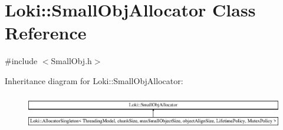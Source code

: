 \hypertarget{classLoki_1_1SmallObjAllocator}{}\section{Loki\+:\+:Small\+Obj\+Allocator Class Reference}
\label{classLoki_1_1SmallObjAllocator}


{\ttfamily \#include $<$Small\+Obj.\+h$>$}

Inheritance diagram for Loki\+:\+:Small\+Obj\+Allocator\+:\begin{figure}[H]
\begin{center}
\leavevmode
\includegraphics[height=1.559888cm]{classLoki_1_1SmallObjAllocator}
\end{center}
\end{figure}
